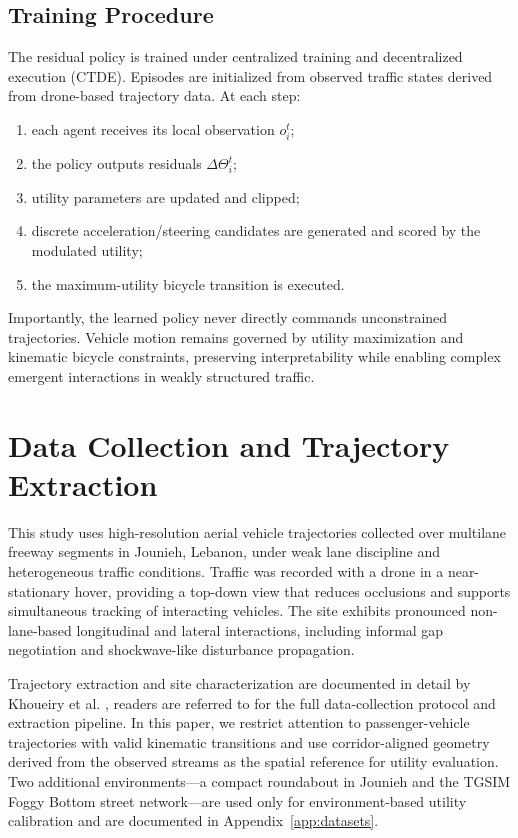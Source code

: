 \documentclass[conference]{IEEEtran}
\begin{document}
\subsection{Training Procedure}
The residual policy is trained under centralized training and decentralized execution (CTDE). Episodes are initialized from observed traffic states derived from drone-based trajectory data. At each step:
\begin{enumerate}
    \item each agent receives its local observation $o_{i}^{t}$;
    \item the policy outputs residuals $\Delta\Theta_{i}^{t}$;
    \item utility parameters are updated and clipped;
    \item discrete acceleration/steering candidates are generated and scored by the modulated utility;
    \item the maximum-utility bicycle transition is executed.
\end{enumerate}
Importantly, the learned policy never directly commands unconstrained trajectories. Vehicle motion remains governed by utility maximization and kinematic bicycle constraints, preserving interpretability while enabling complex emergent interactions in weakly structured traffic.

\section{Data Collection and Trajectory Extraction}
\label{data_extraction}

This study uses high-resolution aerial vehicle trajectories collected over multilane freeway segments in Jounieh, Lebanon, under weak lane discipline and heterogeneous traffic conditions. Traffic was recorded with a drone in a near-stationary hover, providing a top-down view that reduces occlusions and supports simultaneous tracking of interacting vehicles. The site exhibits pronounced non-lane-based longitudinal and lateral interactions, including informal gap negotiation and shockwave-like disturbance propagation.

Trajectory extraction and site characterization are documented in detail by Khoueiry et al. \cite{khoueiry2025universal}, readers are referred to \cite{khoueiry2025universal} for the full data-collection protocol and extraction pipeline. In this paper, we restrict attention to passenger-vehicle trajectories with valid kinematic transitions and use corridor-aligned geometry derived from the observed streams as the spatial reference for utility evaluation. Two additional environments---a compact roundabout in Jounieh and the TGSIM Foggy Bottom street network---are used only for environment-based utility calibration and are documented in Appendix~\ref{app:datasets}.
\end{document}
